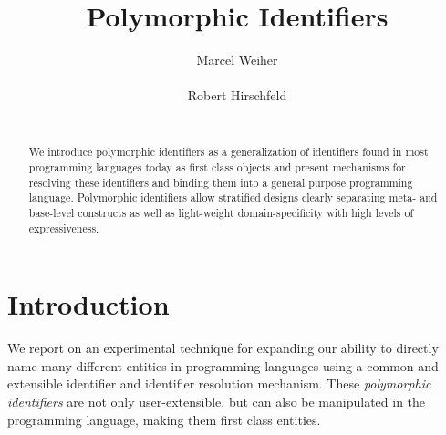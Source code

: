 \documentclass[preprint,authoryear]{acm_proc_article-sp}
\begin{document}


\title{Polymorphic Identifiers}

\author{
\alignauthor Marcel Weiher\\
       \\
\alignauthor Robert Hirschfeld\\
       \\
}

\maketitle

\begin{abstract}
We introduce polymorphic identifiers as a generalization of identifiers found in most
programming languages today as first class objects and present mechanisms for
resolving these identifiers and binding them into a general purpose programming language.
Polymorphic identifiers allow stratified designs clearly separating meta- and base-level constructs
as well as light-weight domain-specificity with high levels of expressiveness.
\end{abstract}


\setlength{\epigraphrule}{0pt}


\section{Introduction}

We report on an experimental
technique for expanding our ability to directly name many different 
entities
in programming languages using a common and extensible identifier and identifier resolution
mechanism.
These \emph{polymorphic identifiers} are not only user-extensible,
but can also be manipulated in the programming language, making them first class 
entities.
\end{document}
